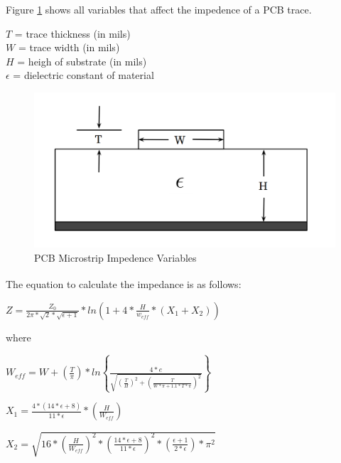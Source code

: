 \documentclass[letterpaper,10pt]{article}
\begin{document}
\begin{spacing}{1.15}
Figure \ref{fig:pcb-trace} shows all variables that affect the impedence of a PCB trace. 

\begin{center}
	$T $ = trace thickness (in mils) \\
	$W$ = trace width  (in mils) \\
	$H$ = heigh of substrate (in mils) \\
	$\epsilon$ = dielectric constant of material
\end{center}

\begin{figure} [H]
	\centering
	\includegraphics[scale=0.3]{PCB_Trace_Figure.png}
	\caption{PCB Microstrip Impedence Variables\label{fig:pcb-trace}}
\end{figure}

The equation to calculate the impedance is as follows\textsuperscript{\cite{Microstrip}}:
\begin{center}
\large$Z = \frac{Z_0}{2\pi*\sqrt{2}*\sqrt{\epsilon+ 1}} * ln\left(1 + 4*\frac{H}{w_{eff}} * \left(X_1 + X_2 \right )\right )$
\end{center}
where
\begin{center}
	\large $W_{eff} = W + \left(\frac{T}{\pi}\right)*ln\left \{\frac{4*e}{\sqrt{\left(\frac{T}{H}\right)^2 + \left (\frac{T}{W*\pi + 1.1*T*\pi }  \right )^{2}}} \right \}$
	
	\vspace{2.5mm}
	
	$X_1 = \frac{4*\left( 14*\epsilon +8\right)}{11*\epsilon} * \left(\frac{H}{W_{eff}} \right)$
	
	\vspace{2.5mm}
	
	$X_2 = \sqrt{16*\left(\frac{H}{W_{eff}} \right )^2 * \left(\frac{14*\epsilon+8}{11*\epsilon} \right )^2 * \left(\frac{\epsilon + 1}{2*\epsilon} \right ) * \pi^2}$
\end{center}


\end{spacing}
\end{document}
